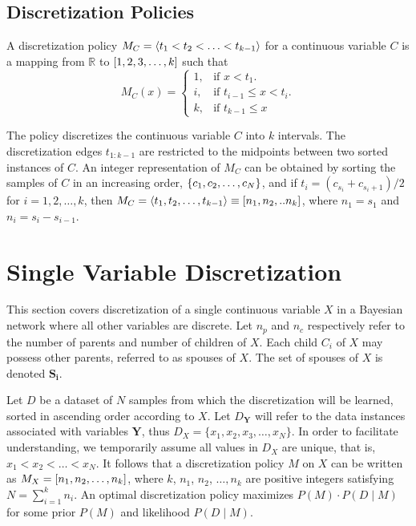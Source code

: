 \subsection{Discretization Policies}

A discretization policy $M_C = \langle t_1 < t_2 < \ldots < t_{k-1} \rangle$ for a continuous variable $C$ is a mapping from $\mathbb{R}$ to $\brock{1,2,3,\ldots,k}$ such that
\begin{equation}
  M_C (x)=\begin{cases}
    1, & \text{if $x<t_1$}.\\
    i, & \text{if $t_{i-1} \leq x < t_i$}\text{.}\\
    k, & \text{if $t_{k-1} \leq x$}
  \end{cases}
\end{equation}

\noindent
The policy discretizes the continuous variable $C$ into $k$ intervals.
The discretization edges $t_{1:k-1}$ are restricted to the midpoints between two sorted instances of $C$.
An integer representation of $M_C$ can be obtained by sorting the samples of $C$ in an increasing order, $\curly{c_1,c_2,\ldots,c_N}$, and if $t_i = (c_{s_{i}} + c_{s_{i}+1})/2$ for $i=1,2,\ldots,k$, then $M_C = \anglebrackets{t_1,t_2, \ldots, t_{k-1}} \equiv \brock{n_1,n_2,..n_k}$, where $n_1 = s_1$ and $n_i = s_{i} - s_{i-1}$.


\section{Single Variable Discretization}
\label{sec:single_var}

This section covers discretization of a single continuous variable $X$ in a Bayesian network where all other variables are discrete.
Let $n_p$ and $n_c$ respectively refer to the number of parents and number of children of $X$.
Each child $C_i$ of $X$ may possess other parents, referred to as spouses of $X$.
The set of spouses of $X$ is denoted $\boldsymbol{S_i}$.

Let $D$ be a dataset of $N$ samples from which the discretization will be learned, sorted in ascending order according to $X$.
Let $D_{\boldsymbol{Y}}$ will refer to the data instances associated with variables $\boldsymbol{Y}$, thus $D_X = \{ x_1,x_2,x_3,\ldots,x_N \}$.
In order to facilitate understanding, we temporarily assume all values in $D_X$ are unique, that is, $x_1 < x_2 < \ldots < x_N$.
It follows that a discretization policy $M$ on $X$ can be written as $M_X = \brock{n_1,n_2,\ldots,n_k}$, where $k$, $n_1$, $n_2$, $\ldots,n_k$ are positive integers satisfying $N = \sum_{i=1}^k n_i$.
An optimal discretization policy maximizes $P(M)\cdot P(D\mid M)$ for some prior $P(M)$ and likelihood $P(D\mid M)$.

